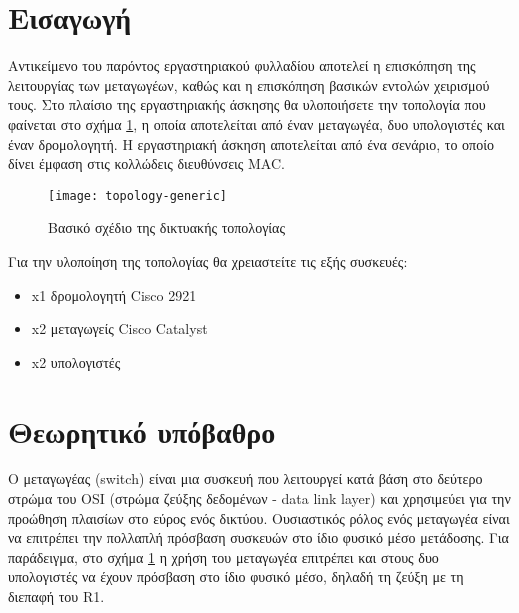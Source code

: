 \documentclass{EdipyLabs} %
\begin{document}
\Initialize

\section*{Εισαγωγή}
Αντικείμενο του παρόντος εργαστηριακού φυλλαδίου αποτελεί η επισκόπηση της λειτουργίας των μεταγωγέων, καθώς και η επισκόπηση βασικών εντολών χειρισμού τους. Στο πλαίσιο της εργαστηριακής άσκησης θα υλοποιήσετε την τοπολογία που φαίνεται στο σχήμα \ref{fig:topology-generic}, η οποία αποτελείται από έναν μεταγωγέα, δυο υπολογιστές και έναν δρομολογητή. Η εργαστηριακή άσκηση αποτελείται από ένα σενάριο, το οποίο δίνει έμφαση στις κολλώδεις διευθύνσεις MAC.

\begin{figure}[H]
	\centering
	\texttt{[image: topology-generic]}
	\caption{Βασικό σχέδιο της δικτυακής τοπολογίας}\label{fig:topology-generic}
\end{figure}

Για την υλοποίηση της τοπολογίας θα χρειαστείτε τις εξής συσκευές:
\begin{itemize}
	\item x1 δρομολογητή Cisco 2921
	\item x2 μεταγωγείς Cisco Catalyst
	\item x2 υπολογιστές
\end{itemize}


\section{Θεωρητικό υπόβαθρο}
Ο μεταγωγέας (switch) είναι μια συσκευή που λειτουργεί κατά βάση στο δεύτερο στρώμα του OSI (στρώμα ζεύξης δεδομένων - data link layer) και χρησιμεύει για την προώθηση πλαισίων στο εύρος ενός δικτύου. Ουσιαστικός ρόλος ενός μεταγωγέα είναι να επιτρέπει την πολλαπλή πρόσβαση συσκευών στο ίδιο φυσικό μέσο μετάδοσης. Για παράδειγμα, στο σχήμα \ref{fig:topology-generic} η χρήση του μεταγωγέα επιτρέπει και στους δυο υπολογιστές να έχουν πρόσβαση στο ίδιο φυσικό μέσο, δηλαδή τη ζεύξη με τη διεπαφή του R1.
\end{document}
